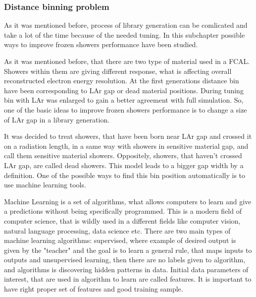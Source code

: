 \subsubsection{Distance binning problem}
As it was mentioned before, process of library generation can be comlicated and take a lot of the time because of the needed tuning. In this subchapter possible ways to improve frozen showers performance have been studied. 
\begin{figure}
\end{figure}

As it was mentioned before, that there are two type of material used in a FCAL. Showers within them are giving different response, what is affecting overall reconstructed electron energy resolution.  At the first generations distance bin have been corresponding to LAr gap or dead material positions. During tuning bin with LAr was enlarged to gain a better agreement with full simulation. So, one of the basic ideas to improve frozen showers performance is to change a size of LAr gap in a library generation. 

It was decided to treat showers, that have been born near LAr gap and crossed it on a radiation length, in a same way with showers in sensitive material gap, and call them sensitive material showers. Oppositely, showers, that haven't crossed LAr gap, are called dead showers. This model leads to a bigger gap width by a definition. One of the possible ways to find this bin position automatically is to use machine learning tools. 

Machine Learning is a set of algorithms, what allows computers to learn and give a predictions without being specifically programmed. This is a modern field of computer science, that is wildly used in a different fields like computer vision, natural language processing, data science etc. There are two main types of machine learning algorithms: supervised, where example of desired output is given by the "teacher" and the goal is to learn a general rule, that maps inputs to outputs and unsupervised learning, then there are no labels given to algorithm, and algorithms is discovering hidden patterns in data. Initial data parameters of interest, that are used in algorithm to learn are called features. It is important to have right proper set of features and good training sample. 

